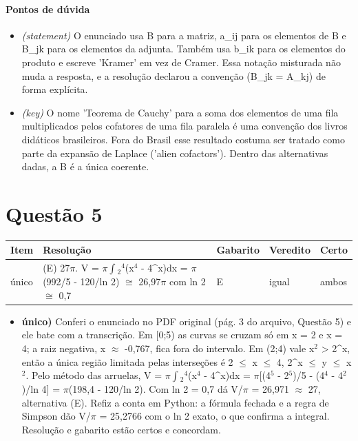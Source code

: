 \documentclass{article}%
\begin{document}
\paragraph{Pontos de dúvida}%
\begin{itemize}%
\item%
\textit{(statement)} O enunciado usa B para a matriz, a\_ij para os elementos de B e B\_jk para os elementos da adjunta. Também usa b\_ik para os elementos do produto e escreve 'Kramer' em vez de Cramer. Essa notação misturada não muda a resposta, e a resolução declarou a convenção (B\_jk = A\_kj) de forma explícita.%
\item%
\textit{(key)} O nome 'Teorema de Cauchy' para a soma dos elementos de uma fila multiplicados pelos cofatores de uma fila paralela é uma convenção dos livros didáticos brasileiros. Fora do Brasil esse resultado costuma ser tratado como parte da expansão de Laplace ('alien cofactors'). Dentro das alternativas dadas, a B é a única coerente.%
\end{itemize}%
\section*{Questão 5}%
\begin{longtable}{@{}p{} p{} p{} p{} p{}@{}}\toprule Item & Resolução & Gabarito & Veredito & Certo \\ \midrule
único & (E) 27$\pi$. V = $\pi$$\int$$_{2}$$^{4}$(x$^{4}$ - 4\^{}x)dx = $\pi$(992/5 - 120/ln 2) $\cong$ 26,97$\pi$ com ln 2 $\cong$ 0,7 & E & igual & ambos \\
\bottomrule\end{longtable}%
\begin{itemize}%
\item%
\textbf{único)} Conferi o enunciado no PDF original (pág. 3 do arquivo, Questão 5) e ele bate com a transcrição. Em {[}0;5) as curvas se cruzam só em x = 2 e x = 4; a raiz negativa, x $\approx$ -0,767, fica fora do intervalo. Em (2;4) vale x$^2$ > 2\^{}x, então a única região limitada pelas interseções é 2 $\leq$ x $\leq$ 4, 2\^{}x $\leq$ y $\leq$ x$^2$. Pelo método das arruelas, V = $\pi$$\int$$_{2}$$^{4}$(x$^{4}$ - 4\^{}x)dx = $\pi${[}(4$^{5}$ - 2$^{5}$)/5 - (4$^{4}$ - 4$^2$)/ln 4{]} = $\pi$(198,4 - 120/ln 2). Com ln 2 = 0,7 dá V/$\pi$ = 26,971 $\approx$ 27, alternativa (E). Refiz a conta em Python: a fórmula fechada e a regra de Simpson dão V/$\pi$ = 25,2766 com o ln 2 exato, o que confirma a integral. Resolução e gabarito estão certos e concordam.%
\end{itemize}%
\end{document}
